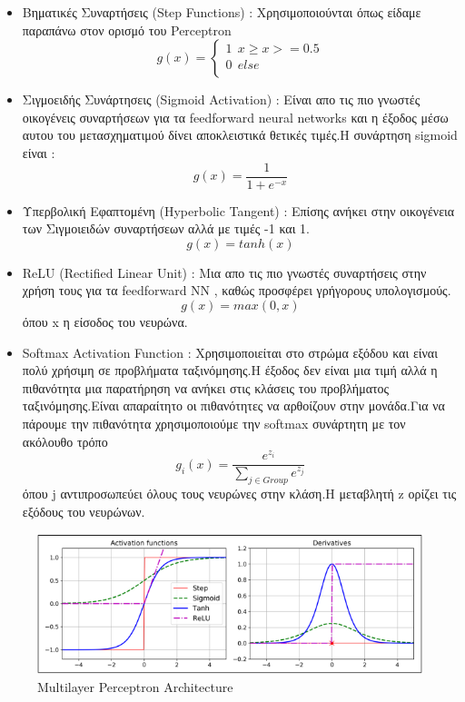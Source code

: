 \documentclass[12pt,a4paper]{article}
\begin{document}
\begin{itemize}
\item Βηματικές Συναρτήσεις (Step Functions) : Χρησιμοποιούνται όπως είδαμε παραπάνω στον ορισμό του Perceptron
$$g(x) =
\begin{cases}
1  \ \ x \geq x>= 0.5\\
0 \ \ else\\
  \end{cases}$$

\item Σιγμοειδής Συνάρτησεις (Sigmoid Activation) : Είναι απο τις πιο γνωστές οικογένεις συναρτήσεων για τα feedforward neural networks και η έξοδος μέσω αυτου του μετασχηματιμού δίνει αποκλειστικά θετικές τιμές.H συνάρτηση sigmoid  είναι :
$$g(x) =\frac{1}{1 + e^{-x}}$$
\item Υπερβολική Εφαπτομένη (Hyperbolic Tangent) : Επίσης ανήκει στην οικογένεια των Σιγμοιειδών συναρτήσεων αλλά με τιμές -1 και 1.
$$g(x)=tanh(x)$$
\item ReLU (Rectified Linear Unit) : Μια απο τις πιο γνωστές συναρτήσεις στην χρήση τους για τα feedforward NN , καθώς προσφέρει γρήγορους υπολογισμούς.
$$g(x) =max(0,x)$$
όπου x η είσοδος του νευρώνα.
\item Softmax Activation Function : Χρησιμοποιείται στο στρώμα εξόδου και είναι πολύ χρήσιμη σε προβλήματα ταξινόμησης.Η έξοδος δεν είναι μια τιμή αλλά η πιθανότητα μια παρατήρηση να ανήκει στις κλάσεις του προβλήματος ταξινόμησης.Είναι απαραίτητο οι πιθανότητες να αρθοίζουν στην μονάδα.Για να πάρουμε την πιθανότητα χρησιμοποιούμε την softmax συνάρτητη με τον ακόλουθο τρόπο
$$g_i(x) = \frac{e^{z_i}}{\sum_{j\in Group}e^{z_j}}$$
όπου j αντιπροσωπεύει όλους τους νευρώνες στην κλάση.H μεταβλητή z ορίζει τις εξόδους του νευρώνων.


\end{itemize}




\begin{figure}[H]
\centering
\includegraphics[width=0.60\linewidth,height=0.20\textheight]{Images/plot16}
\caption{Multilayer Perceptron Architecture}
\label{fig:multi}
\end{figure}
\end{document}
